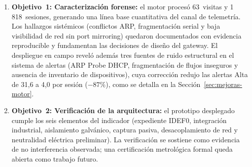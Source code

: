 \begin{enumerate}
    \item \textbf{Objetivo~1: Caracterización forense:} el motor procesó 63~visitas y 1\,818~sesiones, generando una línea base cuantitativa del canal de telemetría. Los hallazgos sistémicos (conflictos ARP, fragmentación serial y baja visibilidad de red sin port mirroring) quedaron documentados con evidencia reproducible y fundamentan las decisiones de diseño del gateway. El despliegue en campo reveló además tres fuentes de ruido estructural en el sistema de alertas (ARP Probe DHCP, fragmentación de flujos inseguros y ausencia de inventario de dispositivos), cuya corrección redujo las alertas Alta de 31{,}6 a 4{,}0 por sesión ($-87\%$), como se detalla en la Sección~\ref{sec:mejoras-motor}.

    \item \textbf{Objetivo~2: Verificación de la arquitectura:} el prototipo desplegado cumple los seis elementos del indicador (expediente IDEF0, integración industrial, aislamiento galvánico, captura pasiva, desacoplamiento de red y neutralidad eléctrica preliminar). La verificación se sostiene como evidencia de no interferencia observada; una certificación metrológica formal queda abierta como trabajo futuro.


\end{enumerate}
